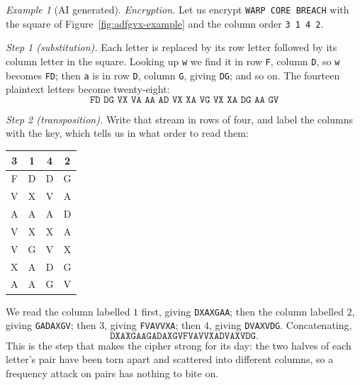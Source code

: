 \documentclass{article}
\theoremstyle{plain}
\theoremstyle{definition}
\theoremstyle{remark}
\newtheorem{example}[theorem]{Example}
\numberwithin{theorem}{section}
\newcommand{\bespokedemo}[1]{\href{bespoke:#1}{\textsf{[\,interactive: #1\,]}}}
\newif\ifweb \webfalse
\DeclareRobustCommand{\webonly}[1]{\ifweb#1\fi}
\begin{document}
\webonly{\bespokedemo{adfgvx-tool}}

\begin{example}[AI generated]
\emph{Encryption.}  Let us encrypt \texttt{WARP CORE BREACH} with the square of Figure~\ref{fig:adfgvx-example} and the column order \texttt{3 1 4 2}.

\emph{Step 1 (substitution).}  Each letter is replaced by its row letter followed by its column letter in the square.  Looking up \texttt{w} we find it in row \texttt{F}, column \texttt{D}, so \texttt{w} becomes \texttt{FD}; then \texttt{a} is in row \texttt{D}, column \texttt{G}, giving \texttt{DG}; and so on.  The fourteen plaintext letters become twenty-eight:
\[
	\texttt{FD DG VX VA AA AD VX XA VG VX XA DG AA GV}
\]

\emph{Step 2 (transposition).}  Write that stream in rows of four, and label the columns with the key, which tells us in what order to read them:
\begin{center}
\begin{tabular}{cccc}
  3 & 1 & 4 & 2 \\
  \hline
  F & D & D & G \\
  V & X & V & A \\
  A & A & A & D \\
  V & X & X & A \\
  V & G & V & X \\
  X & A & D & G \\
  A & A & G & V \\
\end{tabular}
\end{center}
We read the column labelled $1$ first, giving \texttt{DXAXGAA}; then the column labelled $2$, giving \texttt{GADAXGV}; then $3$, giving \texttt{FVAVVXA}; then $4$, giving \texttt{DVAXVDG}.  Concatenating,
\[
	\texttt{DXAXGAAGADAXGVFVAVVXADVAXVDG}.
\]
This is the step that makes the cipher strong for its day:  the two halves of each letter's pair have been torn apart and scattered into different columns, so a frequency attack on pairs has nothing to bite on.


\end{example}
\end{document}
